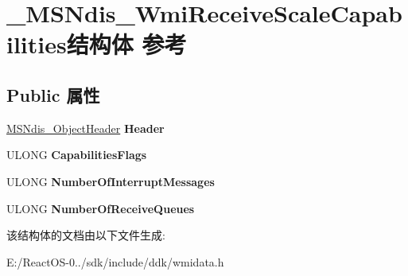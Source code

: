 \hypertarget{struct___m_s_ndis___wmi_receive_scale_capabilities}{}\section{\+\_\+\+M\+S\+Ndis\+\_\+\+Wmi\+Receive\+Scale\+Capabilities结构体 参考}
\label{struct___m_s_ndis___wmi_receive_scale_capabilities}
\subsection*{Public 属性}
\begin{DoxyCompactItemize}
\item 
\mbox{\label{struct___m_s_ndis___wmi_receive_scale_capabilities_a4104b0c52a8b9917b655f3aee5576788}} 
\hyperlink{struct___m_s_ndis___object_header}{M\+S\+Ndis\+\_\+\+Object\+Header} {\bfseries Header}
\item 
\mbox{\label{struct___m_s_ndis___wmi_receive_scale_capabilities_a523d85bfd7bbd035c1d8417adf8646af}} 
U\+L\+O\+NG {\bfseries Capabilities\+Flags}
\item 
\mbox{\label{struct___m_s_ndis___wmi_receive_scale_capabilities_a026e96ab071a159a0bc9366611250f9f}} 
U\+L\+O\+NG {\bfseries Number\+Of\+Interrupt\+Messages}
\item 
\mbox{\label{struct___m_s_ndis___wmi_receive_scale_capabilities_a62ee80810f5b901217e344df189f92f7}} 
U\+L\+O\+NG {\bfseries Number\+Of\+Receive\+Queues}
\end{DoxyCompactItemize}


该结构体的文档由以下文件生成\+:\begin{DoxyCompactItemize}
\item 
E\+:/\+React\+O\+S-\/0../sdk/include/ddk/wmidata.\+h\end{DoxyCompactItemize}
